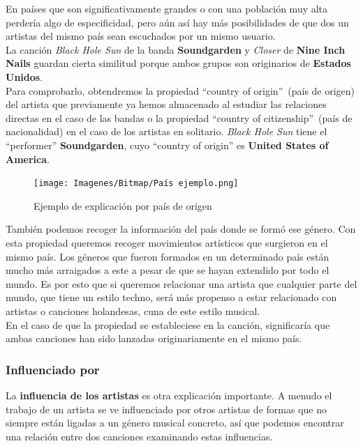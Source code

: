 En países que son significativamente grandes o con una población muy alta perdería algo de especificidad, pero aún así hay más posibilidades de que dos un artistas del mismo país sean escuchados por un mismo usuario.\\

La canción \textit{Black Hole Sun} de la banda \textbf{Soundgarden} y \textit{Closer} de \textbf{Nine Inch Nails} guardan cierta similitud porque ambos grupos son originarios de \textbf{Estados Unidos}.\\

Para comprobarlo, obtendremos la propiedad ``country of origin''~(país de origen) del artista que previamente ya hemos almacenado al estudiar las relaciones directas en el caso de las bandas o la propiedad ``country of citizenship''~(país de nacionalidad) en el caso de los artistas en solitario. \textit{Black Hole Sun} tiene el ``performer'' \textbf{Soundgarden}, cuyo ``country of origin'' es \textbf{United States of America}.\\

\begin{figure}[h!]
	\centering
	\texttt{[image: Imagenes/Bitmap/País ejemplo.png]}
	\caption{Ejemplo de explicación por país de origen}
	\label{fig:sampleImage}
\end{figure}

También podemos recoger la información del país donde se formó ese género. Con esta propiedad queremos recoger movimientos artísticos que surgieron en el mismo país. Los géneros que fueron formados en un determinado país están mucho más arraigados a este a pesar de que se hayan extendido por todo el mundo. Es por esto que si queremos relacionar una artista que cualquier parte del mundo, que tiene un estilo techno, será más propenso a estar relacionado con artistas o canciones holandesas, cuna de este estilo musical.\\

En el caso de que la propiedad se estableciese en la canción, significaría que ambas canciones han sido lanzadas originariamente en el mismo país.\\

\subsubsection*{Influenciado por}

La \textbf{influencia de los artistas} es otra explicación importante. A menudo el trabajo de un artista se ve influenciado por otros artistas de formas que no siempre están ligadas a un género musical concreto, así que podemos encontrar una relación entre dos canciones examinando estas influencias.\\

